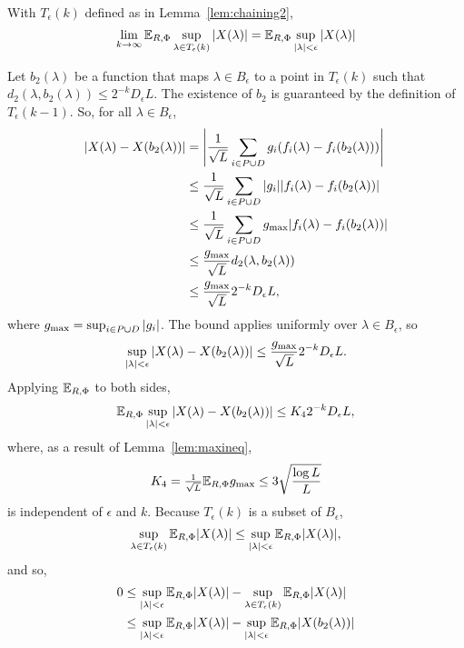 \documentclass[journal]{IEEEtran}
\begin{document}
\begin{lemma}\label{lem:limexpTk} With $T_\epsilon(k)$ defined as in Lemma~\ref{lem:chaining2},
\[
\lim_{k\rightarrow\infty}{\mathbb E}_{R,\Phi}\sup_{\lambda \in T_\epsilon(k)} {\vert X(\lambda) \vert} = {\mathbb E}_{R,\Phi} \sup_{{\vert \lambda \vert} < \epsilon} {\vert X(\lambda) \vert}
\]
\end{lemma}
\begin{IEEEproof}
Let $b_2(\lambda)$ be a function that maps $\lambda \in B_\epsilon$ to a point in $T_\epsilon(k)$ such that  $d_2(\lambda,b_2(\lambda)) \leq 2^{-k}D_\epsilon L$.  The existence of $b_2$ is guaranteed by the definition of $T_\epsilon(k-1)$.  So, for all $\lambda \in B_\epsilon$,
\begin{align*}
{\vert X(\lambda) - X(b_2(\lambda)) \vert} &= {\left\vert \frac{1}{\sqrt{L}}\sum_{i\in P \cup D}g_i(f_i(\lambda) - f_i(b_2(\lambda))) \right\vert} \\
&\leq  \frac{1}{\sqrt{L}}\sum_{i\in P \cup D}{\left\vert g_i \right\vert}{\vert f_i(\lambda) - f_i(b_2(\lambda)) \vert} \\
&\leq \frac{1}{\sqrt{L}} \sum_{i\in P \cup D} g_\text{max} {\vert f_i(\lambda) - f_i(b_2(\lambda)) \vert} \\
&\leq \frac{g_\text{max}}{\sqrt{L}} d_2(\lambda,b_2(\lambda)) \\
&\leq \frac{g_\text{max}}{\sqrt{L}} 2^{-k} D_\epsilon L,
\end{align*}
where $g_\text{max} = \sup_{i\in P\cup D} {\left\vert g_i \right\vert}$. The bound applies uniformly over $\lambda \in B_\epsilon$, so
\[
\sup_{{\vert \lambda \vert} < \epsilon} {\vert X(\lambda) - X(b_2(\lambda)) \vert} \leq \frac{g_\text{max}}{\sqrt{L}} 2^{-k} D_\epsilon L.
\]
Applying ${\mathbb E}_{R,\Phi}$ to both sides,
\[
{\mathbb E}_{R,\Phi} \sup_{{\vert \lambda \vert} < \epsilon} {\vert X(\lambda) - X(b_2(\lambda)) \vert} \leq K_4 2^{-k} D_\epsilon L,
\]
where, as a result of Lemma~\ref{lem:maxineq},
\[
K_4 = \tfrac{1}{\sqrt{L}}{\mathbb E}_{R,\Phi} g_\text{max} \leq 3 \sqrt{\frac{\log L}{L}}
\]
is independent of $\epsilon$ and $k$.  Because $T_\epsilon(k)$ is a subset of $B_\epsilon$,
\[
\sup_{\lambda \in T_\epsilon(k)} {\mathbb E}_{R,\Phi} {\vert X(\lambda) \vert} \leq \sup_{{\vert \lambda \vert} < \epsilon} {\mathbb E}_{R,\Phi} {\vert X(\lambda) \vert},
\]
and so,
\begin{align*}
0 &\leq \sup_{\sabs{\lambda} < \epsilon} \expect_{R,\Phi} \sabs{X(\lambda)} - \sup_{\lambda \in T_\epsilon(k)} \expect_{R,\Phi} \sabs{X(\lambda)} \nonumber \\
&\leq \sup_{\sabs{\lambda} < \epsilon} \expect_{R,\Phi} \sabs{X(\lambda)} - \sup_{\sabs{\lambda} < \epsilon} \expect_{R,\Phi} \sabs{X(b_2(\lambda))} \nonumber \\

\end{align*}
\end{IEEEproof}
\end{document}

